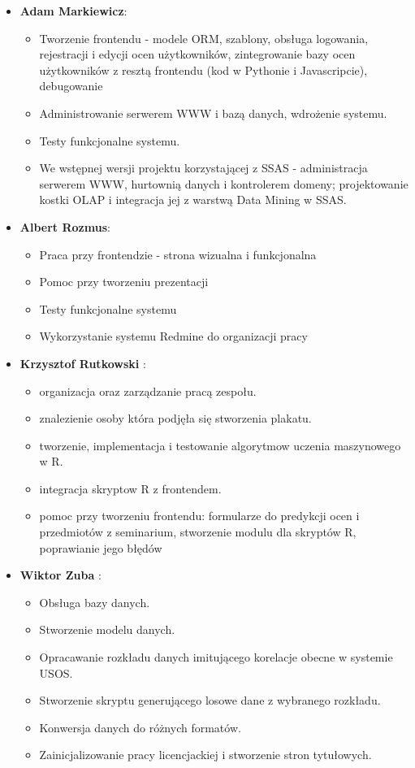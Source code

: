 \documentclass[licencjacka]{pracamgr}
\begin{document}
\begin{itemize}
\item \textbf{Adam Markiewicz}:
	\begin{itemize}
	        \item Tworzenie frontendu - modele ORM, szablony, obsługa logowania, rejestracji i edycji ocen użytkowników, zintegrowanie bazy ocen użytkowników z resztą frontendu (kod w Pythonie i Javascripcie), debugowanie
	        \item Administrowanie serwerem WWW i bazą danych, wdrożenie systemu.
	        \item Testy funkcjonalne systemu.
	        \item We wstępnej wersji projektu korzystającej z SSAS - administracja serwerem WWW, hurtownią danych i kontrolerem domeny; projektowanie kostki OLAP i integracja jej z warstwą Data Mining w SSAS.
	    \end{itemize}
\item \textbf{Albert Rozmus}:
  \begin{itemize}
        \item Praca przy frontendzie - strona wizualna i funkcjonalna
        \item Pomoc przy tworzeniu prezentacji
        \item Testy funkcjonalne systemu
        \item Wykorzystanie systemu Redmine do organizacji pracy
    \end{itemize}
\item \textbf{Krzysztof Rutkowski} :
    \begin{itemize}
        \item organizacja oraz zarządzanie pracą zespołu.
        \item znalezienie osoby która podjęła się stworzenia plakatu.
        \item tworzenie, implementacja i testowanie algorytmow uczenia maszynowego w R.
        \item integracja skryptow R z frontendem.
        \item pomoc przy tworzeniu frontendu: formularze do predykcji ocen i przedmiotów z seminarium, stworzenie modulu dla skryptów R, poprawianie jego błędów
    \end{itemize}
\item \textbf{Wiktor Zuba} :
  \begin{itemize}
        \item Obsługa bazy danych.
        \item Stworzenie modelu danych.
        \item Opracawanie rozkładu danych imitującego korelacje obecne w systemie USOS.
        \item Stworzenie skryptu generującego losowe dane z wybranego rozkładu.
        \item Konwersja danych do różnych formatów.
        \item Zainicjalizowanie pracy licencjackiej i stworzenie stron tytułowych.
    \end{itemize}
\end{itemize}
\end{document}
